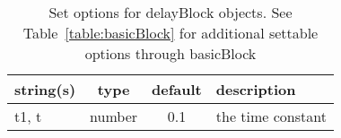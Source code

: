 \begin{table}[ht]
\centering
\begin{tabular}{p{5cm} c c p{7cm}}
\hline
string(s) & type & default & description \\
\hline
t1, t & number & 0.1 & the time constant\\
\hline
\end{tabular}
\caption{Set options for delayBlock objects. See Table~\ref{table:basicBlock} for additional settable options through basicBlock}
\label{table:delayBlock}
\end{table}
